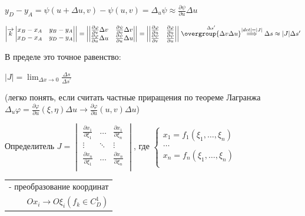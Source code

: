 \documentclass[12pt]{article}
\begin{document}
    $y_D - y_A = \psi(u + \Delta u, v) - \psi(u, v) = \Delta_u \psi \approx \frac{\partial \psi}{\partial u}\Delta u$

    $\left| \overrightarrow{k}
    \begin{vmatrix}
        x_B - x_A & y_B - y_A \\
        x_D - x_A & y_D - y_A
    \end{vmatrix}\right| = \left|
    \begin{vmatrix}
        \frac{\partial \varphi}{\partial v}\Delta v & \frac{\partial \psi}{\partial v}\Delta v \\
        \frac{\partial \varphi}{\partial u}\Delta u & \frac{\partial \psi}{\partial u}\Delta u
    \end{vmatrix}\right| = \left|
    \begin{vmatrix}
        \frac{\partial \varphi}{\partial u} & \frac{\partial \varphi}{\partial u} \\
        \frac{\partial \psi}{\partial v}    & \frac{\partial \psi}{\partial u}
    \end{vmatrix}\right| \stackrel{\Delta s^\prime}{\overgroup{\Delta v \Delta u}} \stackrel{|det| = |J|}{\Longrightarrow} \Delta s \approx |J|\Delta s^\prime$

    \Nota В пределе это точное равенство:

    $|J| = \lim_{\Delta x \to 0} \frac{\Delta s}{\Delta s^\prime}$

    (легко понять, если считать частные приращения по теореме Лагранжа $\Delta_u \varphi = \frac{\partial \varphi}{\partial u}(\xi, \eta) \Delta u \rightarrow \frac{\partial \varphi}{\partial u}(u, v) \Delta u$)

    \Def Определитель $J = \begin{vmatrix}
                               \frac{\partial x_1}{\partial \xi_1} & \dots  & \frac{\partial x_1}{\partial \xi_n} \\
                               \vdots                              & \ddots & \vdots                              \\
                               \frac{\partial x_n}{\partial \xi_1} & \dots  & \frac{\partial x_n}{\partial \xi_n} \\
    \end{vmatrix}$, где $\begin{cases}
                             x_1 = f_1(\xi_1, \dots, \xi_n) \\
                             \dots \\
                             x_n = f_n(\xi_1, \dots, \xi_n) \\
    \end{cases}$ \begin{tabular}{r} - преобразование координат \\ $Ox_i \to O\xi_i (f_k \in C^1_D)$ \end{tabular}
\end{document}
